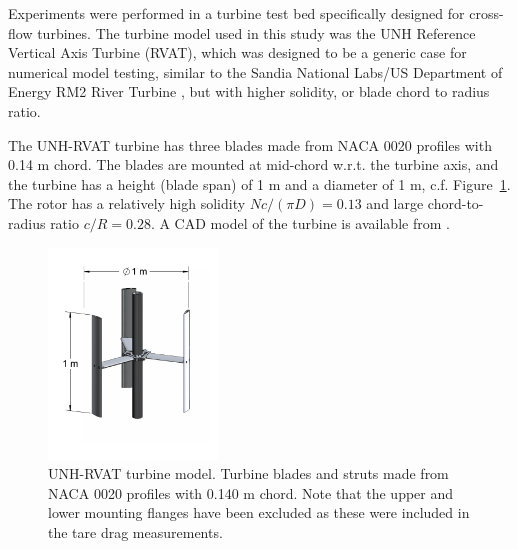 \documentclass[energies,article,accept,moreauthors,pdftex,12pt,a4paper]{mdpi}
\begin{document}
Experiments were performed in a turbine test bed specifically designed for
cross-flow turbines. The turbine model used in this study was the UNH Reference
Vertical Axis Turbine (RVAT), which was designed to be a generic case for
numerical model testing, similar to the Sandia National Labs/US Department of
Energy RM2 River Turbine \cite{Neary2014}, but with higher solidity, or blade
chord to radius ratio.

The UNH-RVAT turbine has three blades made from NACA 0020 profiles with 0.14 m
chord. The blades are mounted at mid-chord w.r.t. the turbine axis, and the
turbine has a height (blade span) of 1 m and a diameter of 1 m, c.f.
Figure~\ref{fig:turbine}. The rotor has a relatively high solidity $Nc/(\pi D) =
0.13$ and large chord-to-radius ratio $c/R = 0.28$. A CAD model of the turbine
is available from \cite{Bachant2014-RVAT-CAD}.

\begin{figure}[ht!]
\centering

\includegraphics[width=0.4\textwidth]{figures/turbine}

\caption{UNH-RVAT turbine model. Turbine blades and struts made from NACA 0020
    profiles with 0.140 m chord. Note that the upper and lower mounting flanges have
    been excluded as these were included in the tare drag measurements.}

\label{fig:turbine}
\end{figure}
\end{document}
